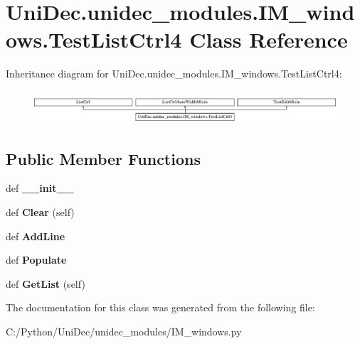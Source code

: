 \hypertarget{class_uni_dec_1_1unidec__modules_1_1_i_m__windows_1_1_test_list_ctrl4}{}\section{Uni\+Dec.\+unidec\+\_\+modules.\+I\+M\+\_\+windows.\+Test\+List\+Ctrl4 Class Reference}
\label{class_uni_dec_1_1unidec__modules_1_1_i_m__windows_1_1_test_list_ctrl4}
Inheritance diagram for Uni\+Dec.\+unidec\+\_\+modules.\+I\+M\+\_\+windows.\+Test\+List\+Ctrl4\+:\begin{figure}[H]
\begin{center}
\leavevmode
\includegraphics[height=1.236203cm]{class_uni_dec_1_1unidec__modules_1_1_i_m__windows_1_1_test_list_ctrl4}
\end{center}
\end{figure}
\subsection*{Public Member Functions}
\begin{DoxyCompactItemize}
\item 
\hypertarget{class_uni_dec_1_1unidec__modules_1_1_i_m__windows_1_1_test_list_ctrl4_a8eda25ba42f31fcbd32d33fedcb85a46}{}def {\bfseries \+\_\+\+\_\+init\+\_\+\+\_\+}\label{class_uni_dec_1_1unidec__modules_1_1_i_m__windows_1_1_test_list_ctrl4_a8eda25ba42f31fcbd32d33fedcb85a46}

\item 
\hypertarget{class_uni_dec_1_1unidec__modules_1_1_i_m__windows_1_1_test_list_ctrl4_a5b6ff590345fa820d70d7eea29a1e47c}{}def {\bfseries Clear} (self)\label{class_uni_dec_1_1unidec__modules_1_1_i_m__windows_1_1_test_list_ctrl4_a5b6ff590345fa820d70d7eea29a1e47c}

\item 
\hypertarget{class_uni_dec_1_1unidec__modules_1_1_i_m__windows_1_1_test_list_ctrl4_a44d0d2463ca009c28d37531ad7130371}{}def {\bfseries Add\+Line}\label{class_uni_dec_1_1unidec__modules_1_1_i_m__windows_1_1_test_list_ctrl4_a44d0d2463ca009c28d37531ad7130371}

\item 
\hypertarget{class_uni_dec_1_1unidec__modules_1_1_i_m__windows_1_1_test_list_ctrl4_a6ed9bb61b23be6c593309575d046b6c2}{}def {\bfseries Populate}\label{class_uni_dec_1_1unidec__modules_1_1_i_m__windows_1_1_test_list_ctrl4_a6ed9bb61b23be6c593309575d046b6c2}

\item 
\hypertarget{class_uni_dec_1_1unidec__modules_1_1_i_m__windows_1_1_test_list_ctrl4_a8c7c0006b1b2d33bbf4a1b0fdc30a246}{}def {\bfseries Get\+List} (self)\label{class_uni_dec_1_1unidec__modules_1_1_i_m__windows_1_1_test_list_ctrl4_a8c7c0006b1b2d33bbf4a1b0fdc30a246}

\end{DoxyCompactItemize}


The documentation for this class was generated from the following file\+:\begin{DoxyCompactItemize}
\item 
C\+:/\+Python/\+Uni\+Dec/unidec\+\_\+modules/I\+M\+\_\+windows.\+py\end{DoxyCompactItemize}
